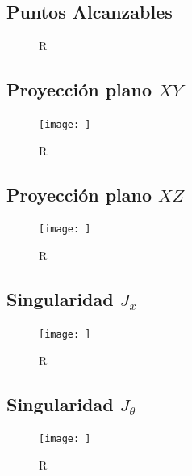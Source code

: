     \subsection{Puntos Alcanzables}
    
        \begin{figure}[h]
            \centering
            \caption{R}
            \label{f:cap7_ws1}
        \end{figure}    
        
    \newpage

    
    \subsection{Proyección plano $XY$}
        \begin{figure}[h]
            \centering
            \texttt{[image: ]}
            \caption{R}
            \label{f:cap7_ws2}
        \end{figure}  
    
    \subsection{Proyección plano $XZ$}
        \begin{figure}[h]
            \centering
            \texttt{[image: ]}
            \caption{R}
            \label{f:cap7_ws3}
        \end{figure}  
        
    \newpage
    
    \subsection{Singularidad $J_{x}$}
        \begin{figure}[h]
            \centering
            \texttt{[image: ]}
            \caption{R}
            \label{f:cap7_ws4}
        \end{figure}  
    
    \subsection{Singularidad $J_{\theta}$}
        \begin{figure}[h]
            \centering
            \texttt{[image: ]}
            \caption{R}
            \label{f:cap7_ws5}
        \end{figure}  
        
